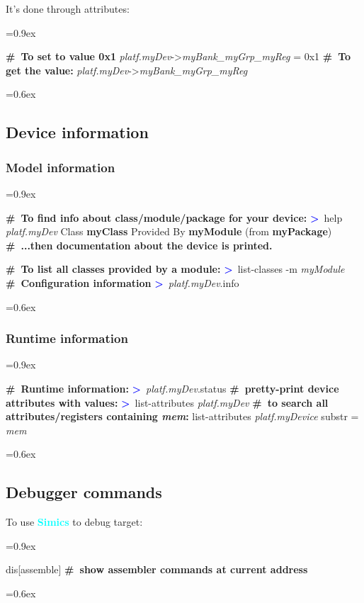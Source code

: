 \documentclass[8pt]{extarticle}
\newenvironment{code}[1][]{%
\begin{prebox}[#1]\obeylines%
\fontdimen2\font=0.9ex%
}{%
\end{prebox}%
\fontdimen2\font=0.6ex%
}
\newcommand{\ind}{\hphantom{~~~}}
\newcommand{\sprompt}{\textcolor{blue}{\textbf{>}\ }}
\newcommand{\cmtcommon}[1]{\textcolor{Sepia}{\textbf{#1}}}
\newcommand{\cmt}[1]{\cmtcommon{\#\ #1}}
\newcommand{\p}[1]{\textit{\large#1}}
\newcommand{\Simics}{\textcolor{cyan}{\textbf{Simics}}}
\begin{document}
\begin{multicols*}{3}
It's done through attributes:
\begin{code}
    \cmt{To set to value 0x1}
    \p{platf.myDev}->\p{myBank_myGrp_myReg} = 0x1
    \cmt{To get the value:}
    \p{platf.myDev}->\p{myBank_myGrp_myReg}
\end{code}

\subsection{Device information}

\subsubsection{Model information}

\begin{code}
    \cmt{To find info about class/module/package for your device:}
    \sprompt help \p{platf.myDev}
    \ind Class \textbf{myClass}
    \vspace{0.3em} \ind Provided By
    \ind \ind   \textbf{myModule} (from \textbf{myPackage})
    \vspace{0.2em}
    \ind \cmt{...then documentation about the device is printed.}
    \vspace{0.3em}

    \cmt{To list all classes provided by a module:}
    \sprompt list-classes -m \p{myModule}
    \cmt{Configuration information}
    \sprompt \p{platf.myDev}.info
\end{code}

\subsubsection{Runtime information}

\begin{code}
    \cmt{Runtime information:}
    \sprompt \p{platf.myDev}.status
    \cmt{pretty-print device attributes with values:}
    \sprompt list-attributes \p{platf.myDev}
    \cmt{to search all attributes/registers containing \p{mem}:}
    list-attributes \p{platf.myDevice} substr = \p{mem}
\end{code}


\subsection{Debugger commands}
To use \Simics{} to debug target:
\begin{code}
dis[assemble] \cmt{show assembler commands at current address}


\end{code}
\end{multicols*}
\end{document}
